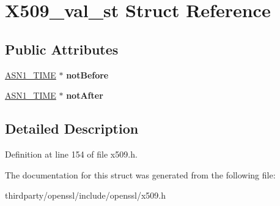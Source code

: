 \hypertarget{struct_x509__val__st}{}\section{X509\+\_\+val\+\_\+st Struct Reference}
\label{struct_x509__val__st}
\subsection*{Public Attributes}
\begin{DoxyCompactItemize}
\item 
\mbox{\label{struct_x509__val__st_a49893ccde75b6fb542b3188fe158530d}} 
\hyperlink{structasn1__string__st}{A\+S\+N1\+\_\+\+T\+I\+ME} $\ast$ {\bfseries not\+Before}
\item 
\mbox{\label{struct_x509__val__st_a9d46618a37d4511c009469509b883838}} 
\hyperlink{structasn1__string__st}{A\+S\+N1\+\_\+\+T\+I\+ME} $\ast$ {\bfseries not\+After}
\end{DoxyCompactItemize}


\subsection{Detailed Description}


Definition at line 154 of file x509.\+h.



The documentation for this struct was generated from the following file\+:\begin{DoxyCompactItemize}
\item 
thirdparty/openssl/include/openssl/x509.\+h\end{DoxyCompactItemize}
